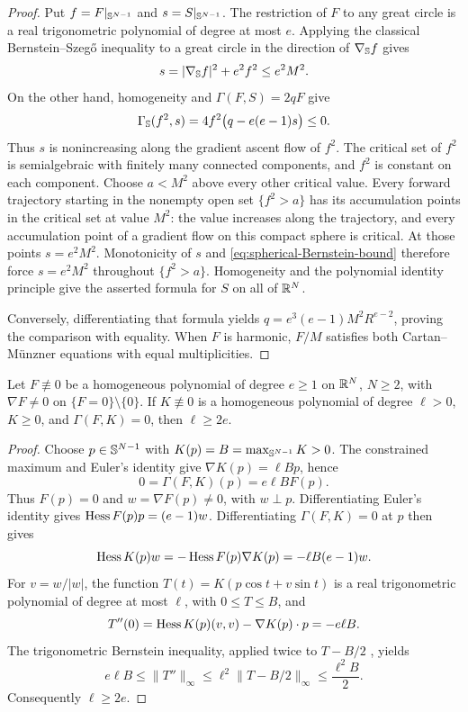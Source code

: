 \begin{proof}
Put \(f=F|_{\mathbb S^{N-1}}\) and \(s=S|_{\mathbb S^{N-1}}\).
The restriction of \(F\) to any great circle is a real trigonometric
polynomial of degree at most \(e\). Applying the classical
Bernstein--Szeg\H{o} inequality
\cite[Section~5.1, Theorem~5.1.3]{BorweinErdelyi95} to a great circle in the
direction of \(\nabla_{\mathbb S}f\) gives
\begin{equation}\label{eq:spherical-Bernstein-bound}
 s=|\nabla_{\mathbb S}f|^2+e^2f^2\le e^2M^2.
\end{equation}
On the other hand, homogeneity and \(\Gamma(F,S)=2qF\) give
\[
 \Gamma_{\mathbb S}(f^2,s)
 =4f^2\bigl(q-e(e-1)s\bigr)\le0.
\]
Thus \(s\) is nonincreasing along the gradient ascent flow of
\(f^2\). The critical set of \(f^2\) is semialgebraic with
finitely many connected components, and \(f^2\) is constant on each
component. Choose \(a<M^2\) above every other critical value.
Every forward trajectory starting in the nonempty open set
\(\{f^2>a\}\) has its accumulation points in the critical set at
value \(M^2\): the value increases along the trajectory, and every
accumulation point of a gradient flow on this compact sphere is
critical. At those points \(s=e^2M^2\). Monotonicity of \(s\)
and \eqref{eq:spherical-Bernstein-bound} therefore force
\(s=e^2M^2\) throughout \(\{f^2>a\}\). Homogeneity and the
polynomial identity principle give the asserted formula for \(S\)
on all of \(\mathbb R^N\).

Conversely, differentiating that formula yields
\(q=e^3(e-1)M^2R^{e-2}\), proving the comparison with equality.
When \(F\) is harmonic, \(F/M\) satisfies both Cartan--M\"unzner
equations with equal multiplicities.
\end{proof}

\begin{lemma}
\label{lem:nonnegative-first-integral-degree}
Let \(F\not\equiv0\) be a homogeneous polynomial of degree \(e\ge1\)
on \(\mathbb R^N\), \(N\ge2\), with
\(\nabla F\ne0\) on \(\{F=0\}\setminus\{0\}\).
If \(K\not\equiv0\) is a homogeneous polynomial of degree \(\ell>0\),
\(K\ge0\), and \(\Gamma(F,K)=0\), then \(\ell\ge2e\).
\end{lemma}

\begin{proof}
Choose \(p\in\mathbb S^{N-1}\) with
\(K(p)=B=\max_{\mathbb S^{N-1}}K>0\).
The constrained maximum and Euler's identity give
\(\nabla K(p)=\ell Bp\), hence
\[
 0=\Gamma(F,K)(p)=e\ell BF(p).
\]
Thus \(F(p)=0\) and \(w=\nabla F(p)\ne0\), with \(w\perp p\).
Differentiating Euler's identity gives
\(\operatorname{Hess} F(p)p=(e-1)w\). Differentiating
\(\Gamma(F,K)=0\) at \(p\) then gives
\[
 \operatorname{Hess} K(p)w=-\operatorname{Hess} F(p)\nabla K(p)=-\ell B(e-1)w.
\]
For \(v=w/|w|\), the function
\(T(t)=K(p\cos t+v\sin t)\) is a real trigonometric polynomial
of degree at most \(\ell\), with \(0\le T\le B\), and
\[
 T''(0)=\operatorname{Hess} K(p)(v,v)-\nabla K(p)\cdot p=-e\ell B.
\]
The trigonometric Bernstein inequality, applied twice to \(T-B/2\)
\cite[Section~5.1, Theorem~5.1.4]{BorweinErdelyi95}, yields
\[
 e\ell B\le\|T''\|_\infty
 \le\ell^2\|T-B/2\|_\infty\le\frac{\ell^2B}{2}.
\]
Consequently \(\ell\ge2e\).
\end{proof}

